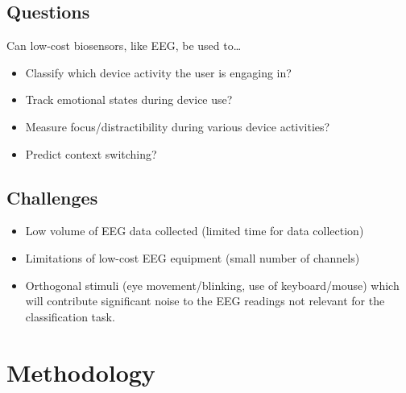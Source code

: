 \documentclass{IEEEtran}
\begin{document}
\begin{refsection}



\subsection{Questions}

Can low-cost biosensors, like EEG, be used to\ldots

\begin{itemize}
    \item Classify which device activity the user is engaging in?
    \item Track emotional states during device use?
    \item Measure focus/distractibility during various device activities?
    \item Predict context switching?
\end{itemize}

\subsection{Challenges}

\begin{itemize}
    \item Low volume of EEG data collected (limited time for data collection)
    \item Limitations of low-cost EEG equipment (small number of channels)
    \item Orthogonal stimuli (eye movement/blinking, use of keyboard/mouse) which will contribute significant noise to the EEG readings not relevant for the classification task.
\end{itemize}

\section{Methodology}


\end{refsection}
\end{document}
